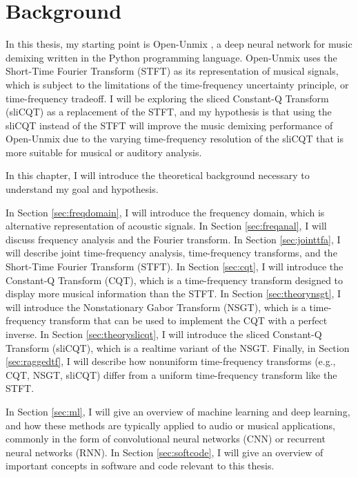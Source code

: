 \documentclass[report.tex]{subfiles}
\begin{document}
\section{Background}
\label{ch:background}

In this thesis, my starting point is Open-Unmix \parencite{umx}, a deep neural network for music demixing written in the Python programming language. Open-Unmix uses the Short-Time Fourier Transform (STFT) as its representation of musical signals, which is subject to the limitations of the time-frequency uncertainty principle, or time-frequency tradeoff. I will be exploring the sliced Constant-Q Transform (sliCQT) as a replacement of the STFT, and my hypothesis is that using the sliCQT instead of the STFT will improve the music demixing performance of Open-Unmix due to the varying time-frequency resolution of the sliCQT that is more suitable for musical or auditory analysis.

In this chapter, I will introduce the theoretical background necessary to understand my goal and hypothesis.

In Section \ref{sec:freqdomain}, I will introduce the frequency domain, which is alternative representation of acoustic signals. In Section \ref{sec:freqanal}, I will discuss frequency analysis and the Fourier transform. In Section \ref{sec:jointtfa}, I will describe joint time-frequency analysis, time-frequency transforms, and the Short-Time Fourier Transform (STFT). In Section \ref{sec:cqt}, I will introduce the Constant-Q Transform (CQT), which is a time-frequency transform designed to display more musical information than the STFT. In Section \ref{sec:theorynsgt}, I will introduce the Nonstationary Gabor Transform (NSGT), which is a time-frequency transform that can be used to implement the CQT with a perfect inverse. In Section \ref{sec:theoryslicqt}, I will introduce the sliced Constant-Q Transform (sliCQT), which is a realtime variant of the NSGT. Finally, in Section \ref{sec:raggedtf}, I will describe how nonuniform time-frequency transforms (e.g., CQT, NSGT, sliCQT) differ from a uniform time-frequency transform like the STFT.

In Section \ref{sec:ml}, I will give an overview of machine learning and deep learning, and how these methods are typically applied to audio or musical applications, commonly in the form of convolutional neural networks (CNN) or recurrent neural networks (RNN). In Section \ref{sec:softcode}, I will give an overview of important concepts in software and code relevant to this thesis.
\end{document}
